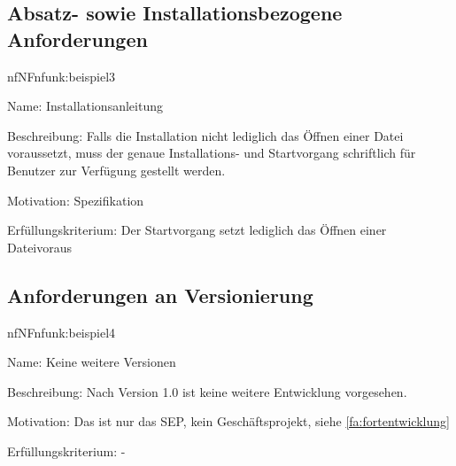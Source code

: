 %

\subsection{Absatz- sowie Installationsbezogene Anforderungen}

\begin{description}[leftmargin=5em, style=sameline]	
	\begin{lhp}{nf}{NF}{nfunk:beispiel3}
		\item [Name:] Installationsanleitung	
		\item [Beschreibung:] Falls die Installation nicht lediglich das Öffnen einer Datei voraussetzt, muss der genaue Installations- und Startvorgang schriftlich für Benutzer zur Verfügung gestellt werden.
		\item [Motivation:] Spezifikation
		\item [Erfüllungskriterium:] Der Startvorgang setzt lediglich das Öffnen einer Dateivoraus
	\end{lhp}
\end{description}

\subsection{Anforderungen an Versionierung}

\begin{description}[leftmargin=5em, style=sameline]	
	\begin{lhp}{nf}{NF}{nfunk:beispiel4}
		\item [Name:] Keine weitere Versionen
		\item [Beschreibung:] Nach Version 1.0 ist keine weitere Entwicklung vorgesehen.
		\item [Motivation:] Das ist nur das SEP, kein Geschäftsprojekt, siehe \ref{fa:fortentwicklung}
		\item [Erfüllungskriterium:] -
	\end{lhp}
\end{description}

